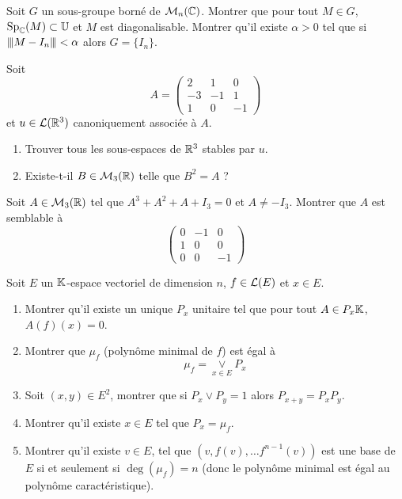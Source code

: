 \documentclass[12pt]{article}
\begin{document}
\begin{exercise}
	Soit $G$ un sous-groupe borné de $\mathcal{M}_{n}(\mathbb{C})$. Montrer que pour tout $M\in G$, $\operatorname{Sp}_{\mathbb{C}}(M)\subset \mathbb{U}$ et $M$ est diagonalisable. Montrer qu'il existe $\alpha>0$ tel que si ${\left\vert\kern-0.25ex\left\vert\kern-0.25ex\left\vert{}M-I_{n} \right\vert\kern-0.25ex\right\vert\kern-0.25ex\right\vert}<\alpha$ alors $G=\{I_{n}\}$.
\end{exercise}

\begin{exercise}
	Soit 
	$$
	A=
	\begin{pmatrix}
		2 & 1 & 0\\
		-3 & -1 & 1\\
		1 & 0 & -1
	\end{pmatrix}
	$$
	et $u\in\mathcal{L}(\mathbb{R}^{3})$ canoniquement associée à $A$.
	\begin{enumerate}
		\item Trouver tous les sous-espaces de $\mathbb{R}^{3}$ stables par $u$.
		\item Existe-t-il $B\in\mathcal{M}_{3}(\mathbb{R})$ telle que $B^{2}=A$ ?
	\end{enumerate}
\end{exercise}

\begin{exercise}
	Soit $A\in\mathcal{M}_{3}(\mathbb{R})$ tel que $A^{3}+A^{2}+A+I_{3}=0$ et $A\neq -I_{3}$. Montrer que $A$ est semblable à
	$$
	\begin{pmatrix}
		0 & -1 & 0\\
		1 & 0 & 0\\
		0 & 0 & -1
	\end{pmatrix}
	$$
\end{exercise}

\begin{exercise}
	Soit $E$ un $\mathbb{K}$-espace vectoriel de dimension $n$, $f\in\mathcal{L}(E)$ et $x\in E$.
	\begin{enumerate}
		\item Montrer qu'il existe un unique $P_{x}$ unitaire tel que pour tout $A\in P_{x}\mathbb{K}$, $A(f)(x)=0$.
		\item Montrer que $\mu_{f}$ (polynôme minimal de $f$) est égal à 
		$$\mu_{f}=\underset{x\in E}{\vee}P_{x}$$
		\item Soit $(x,y)\in E^{2}$, montrer que si $P_{x}\vee P_{y}=1$ alors $P_{x+y}=P_{x}P_{y}$.
		\item Montrer qu'il existe $x\in E$ tel que $P_{x}=\mu_{f}$.
		\item Montrer qu'il existe $v\in E$, tel que $(v,f(v),\dots f^{n-1}(v))$ est une base de $E$ si et seulement si $\deg(\mu_{f})=n$ (donc le polynôme minimal est égal au polynôme caractéristique).
	\end{enumerate}
\end{exercise}
\end{document}
